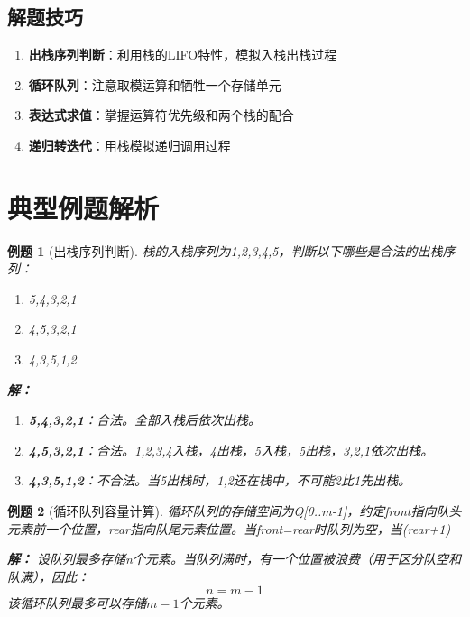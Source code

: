 \documentclass[12pt,a4paper]{amsart}
\newtheorem{example}{例题}[section]
\begin{document}
\subsection{解题技巧}

\begin{enumerate}
\item \textbf{出栈序列判断}：利用栈的LIFO特性，模拟入栈出栈过程
\item \textbf{循环队列}：注意取模运算和牺牲一个存储单元
\item \textbf{表达式求值}：掌握运算符优先级和两个栈的配合
\item \textbf{递归转迭代}：用栈模拟递归调用过程
\end{enumerate}

\section{典型例题解析}

\begin{example}[出栈序列判断]
栈的入栈序列为1,2,3,4,5，判断以下哪些是合法的出栈序列：
\begin{enumerate}
\item 5,4,3,2,1
\item 4,5,3,2,1  
\item 4,3,5,1,2
\end{enumerate}

\textbf{解：}
\begin{enumerate}
\item \textbf{5,4,3,2,1}：合法。全部入栈后依次出栈。
\item \textbf{4,5,3,2,1}：合法。1,2,3,4入栈，4出栈，5入栈，5出栈，3,2,1依次出栈。
\item \textbf{4,3,5,1,2}：不合法。当5出栈时，1,2还在栈中，不可能2比1先出栈。
\end{enumerate}
\end{example}

\begin{example}[循环队列容量计算]
循环队列的存储空间为Q[0..m-1]，约定front指向队头元素前一个位置，rear指向队尾元素位置。当front=rear时队列为空，当(rear+1)%

\textbf{解：}
设队列最多存储n个元素。当队列满时，有一个位置被浪费（用于区分队空和队满），因此：
$$n = m - 1$$
该循环队列最多可以存储$m-1$个元素。
\end{example}
\end{document}
